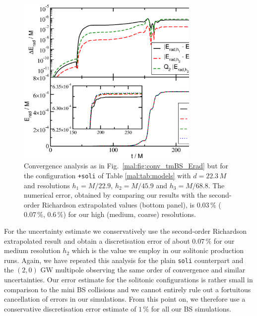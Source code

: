 \begin{figure}[t]
    \centering
    \includegraphics[width=250pt]{malaise_source/conv_tsBS_Erad.eps}
    \caption{Convergence analysis as in
    Fig.~\ref{mal:fig:conv_tmBS_Erad} but for the configuration
    {\tt +soli} of Table \ref{mal:tab:models} with
    $d=22.3\,M$ and
    resolutions $h_1=M/22.9$, $h_2=M/45.9$ and $h_3=M/68.8$.
    The numerical error,
    obtained by comparing our results
    with the second-order Richardson extrapolated values
    (bottom panel),
    is $0.03\,\%$ ($0.07\,\%$, $0.6\,\%$) for
    our high (medium, coarse) resolutions.
    }
    \label{mal:fig:conv_tsBS_Erad}
\end{figure}
%
For the uncertainty estimate we conservatively use
the second-order Richardson extrapolated result and
obtain a discretisation error of about $0.07\,\%$ for
our medium resolution $h_2$ which is the value
we employ in our solitonic production runs. Again,
we have repeated this analysis for the plain
{\tt soli} counterpart and the $(2,0)$ GW multipole
observing the same order of convergence and similar uncertainties. Our error estimate for the solitonic
configurations is rather small in comparison to the
mini BS collisions and we cannot entirely rule out a
fortuitous cancellation of errors in our simulations.
From this point on, we therefore use a conservative
discretisation error estimate of $1\,\%$ for all
our BS simulations.


